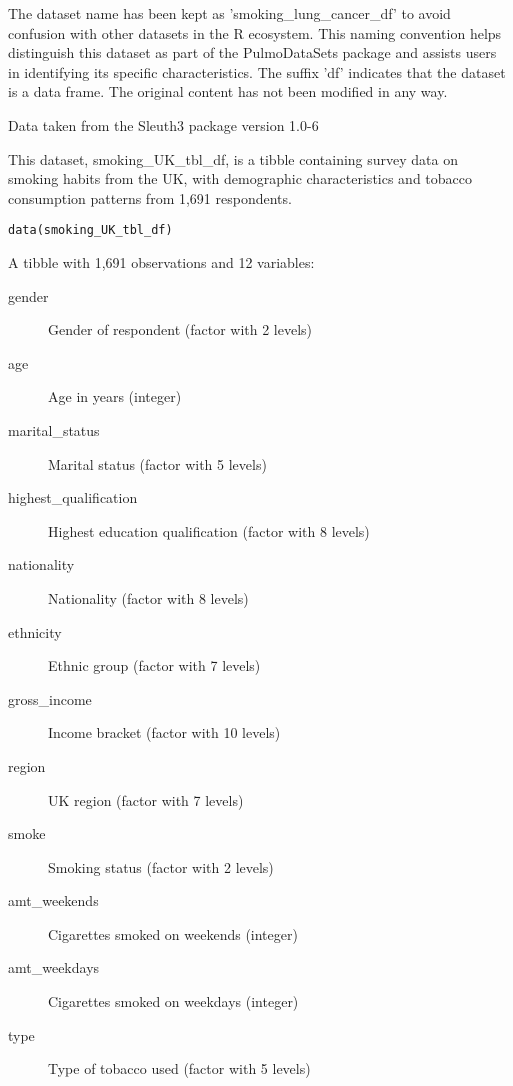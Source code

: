 \documentclass[a4paper]{book}
\begin{document}
%
\begin{Details}
The dataset name has been kept as 'smoking\_lung\_cancer\_df' to avoid confusion with other datasets
in the R ecosystem. This naming convention helps distinguish this dataset as part of the
PulmoDataSets package and assists users in identifying its specific characteristics.
The suffix 'df' indicates that the dataset is a data frame. The original content has not been modified
in any way.
\end{Details}
%
\begin{Source}
Data taken from the Sleuth3 package version 1.0-6
\end{Source}
%
\begin{Description}
This dataset, smoking\_UK\_tbl\_df, is a tibble containing survey data on smoking habits
from the UK, with demographic characteristics and tobacco consumption patterns
from 1,691 respondents.
\end{Description}
%
\begin{Usage}
\begin{verbatim}
data(smoking_UK_tbl_df)
\end{verbatim}
\end{Usage}
%
\begin{Format}
A tibble with 1,691 observations and 12 variables:
\begin{description}

\item[gender] Gender of respondent (factor with 2 levels)
\item[age] Age in years (integer)
\item[marital\_status] Marital status (factor with 5 levels)
\item[highest\_qualification] Highest education qualification (factor with 8 levels)
\item[nationality] Nationality (factor with 8 levels)
\item[ethnicity] Ethnic group (factor with 7 levels)
\item[gross\_income] Income bracket (factor with 10 levels)
\item[region] UK region (factor with 7 levels)
\item[smoke] Smoking status (factor with 2 levels)
\item[amt\_weekends] Cigarettes smoked on weekends (integer)
\item[amt\_weekdays] Cigarettes smoked on weekdays (integer)
\item[type] Type of tobacco used (factor with 5 levels)

\end{description}

\end{Format}
\end{document}

